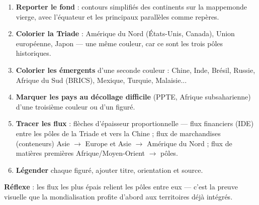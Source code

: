 \documentclass[11pt]{article}
\begin{document}
\begin{methode}
\begin{enumerate}
\item \textbf{Reporter le fond} : contours simplifiés des continents sur la mappemonde vierge, avec l'équateur et les principaux parallèles comme repères.
\item \textbf{Colorier la Triade} : Amérique du Nord (États-Unis, Canada), Union européenne, Japon — une même couleur, car ce sont les trois pôles historiques.
\item \textbf{Colorier les émergents} d'une seconde couleur : Chine, Inde, Brésil, Russie, Afrique du Sud (BRICS), Mexique, Turquie, Malaisie...
\item \textbf{Marquer les pays au décollage difficile} (PPTE, Afrique subsaharienne) d'une troisième couleur ou d'un figuré.
\item \textbf{Tracer les flux} : flèches d'épaisseur proportionnelle — flux financiers (IDE) entre les pôles de la Triade et vers la Chine ; flux de marchandises (conteneurs) Asie $\to$ Europe et Asie $\to$ Amérique du Nord ; flux de matières premières Afrique/Moyen-Orient $\to$ pôles.
\item \textbf{Légender} chaque figuré, ajouter titre, orientation et source.
\end{enumerate}
\textbf{Réflexe} : les flux les plus épais relient les pôles entre eux — c'est la preuve visuelle que la mondialisation profite d'abord aux territoires déjà intégrés.
\end{methode}
\end{document}
